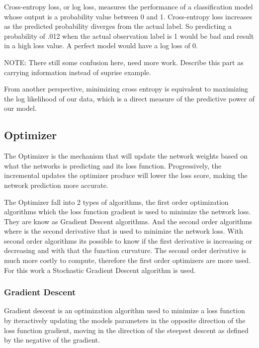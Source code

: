 \iffalse
Entropy
$$H\left ( P \right )=-\int P\left ( x \right )\log\left ( P\left ( x \right ) \right )$$

Cross-Entropy

$$H\left ( y,y{'} \right )=-\sum y*\log\left ( y{'} \right )$$
\fi

Cross-entropy loss, or log loss, measures the performance of a classification model whose output is a probability value between 0 and 1. Cross-entropy loss increases as the predicted probability diverges from the actual label. So predicting a probability of .012 when the actual observation label is 1 would be bad and result in a high loss value. A perfect model would have a log loss of 0.

NOTE: 
There still some confusion here, need more work. Describe this part as carrying information instead of suprise example.

From another perspective, minimizing cross entropy is equivalent to maximizing the log likelihood of our data, which is a direct measure of the predictive power of our model.

\subsection{Optimizer}

The Optimizer is the mechanism that will update the network weights based on what the networks is predicting and its loss function. Progressively, the incremental updates the optimizer produce will lower the loss score, making the network prediction more accurate.

The Optimizer fall into 2 types of algorithms, the first order optimization algorithms which the loss function gradient is used to minimize the network loss. They are know as Gradient Descent algorithms. And the second order algorithms where is the second derivative that is used to minimize the network loss. With second order algorithms its possible to know if the first derivative is increasing or decreasing and with that the function curvature.
The second order derivative is much more costly to compute, therefore the first order optimizers are more used. For this work a Stochastic Gradient Descent algorithm is used. \cite{SGDS_REVIEW}

\subsubsection{Gradient Descent}

Gradient descent is an optimization algorithm used to minimize a loss function by iteractively updating the models parameters in the opposite direction of the loss function gradient, moving in the direction of the steepest descent as defined by the negative of the gradient.

